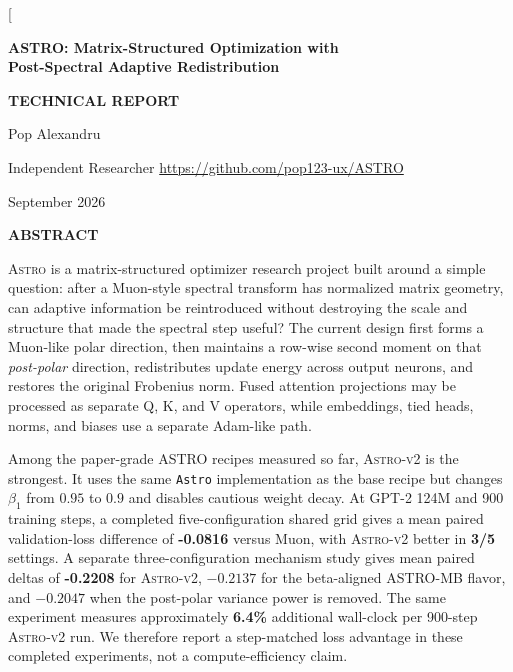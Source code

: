 \documentclass[10pt,twocolumn]{article}
\newcommand{\ASTRO}{\textsc{Astro}\xspace}
\newcommand{\ASTROv}{\textsc{Astro-v2}\xspace}
\newcommand{\good}[1]{\textcolor{astropurple}{\textbf{#1}}}
\begin{document}
\twocolumn[
\begin{@twocolumnfalse}
\begin{center}
{\LARGE\bfseries ASTRO: Matrix-Structured Optimization with\\
Post-Spectral Adaptive Redistribution\par}
\vspace{0.42em}
{\small\bfseries TECHNICAL REPORT\par}
\vspace{0.58em}
{\normalsize Pop Alexandru\par}
{\small Independent Researcher \quad \url{https://github.com/pop123-ux/ASTRO}\par}
{\small September 2026\par}
\end{center}
\vspace{0.35em}

\begin{minipage}{0.96\textwidth}
\small
\textbf{ABSTRACT}

\ASTRO is a matrix-structured optimizer research project built around a simple
question: after a Muon-style spectral transform has normalized matrix geometry,
can adaptive information be reintroduced without destroying the scale and
structure that made the spectral step useful? The current design first forms a
Muon-like polar direction, then maintains a row-wise second moment on that
\emph{post-polar} direction, redistributes update energy across output neurons,
and restores the original Frobenius norm. Fused attention projections may be
processed as separate Q, K, and V operators, while embeddings, tied heads,
norms, and biases use a separate Adam-like path.

Among the paper-grade ASTRO recipes measured so far, \ASTROv is the strongest.
It uses the same \texttt{Astro} implementation as the base recipe but changes
$\beta_1$ from $0.95$ to $0.9$ and disables cautious weight decay. At GPT-2
124M and 900 training steps, a completed five-configuration shared grid gives a
mean paired validation-loss difference of \good{-0.0816} versus Muon, with
\ASTROv better in \good{3/5} settings. A separate three-configuration mechanism
study gives mean paired deltas of \good{-0.2208} for \ASTROv, $-0.2137$ for the
beta-aligned ASTRO-MB flavor, and $-0.2047$ when the post-polar variance power is
removed. The same experiment measures approximately \textbf{6.4\%} additional
wall-clock per 900-step \ASTROv run. We therefore report a step-matched loss
advantage in these completed experiments, not a compute-efficiency claim.
\end{minipage}


\end{@twocolumnfalse}
\end{document}
